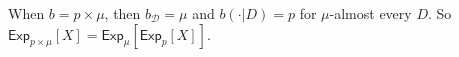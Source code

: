 \documentclass[a4paper,final]{article}
\newcommand\A{\mathcal{A}}
\newcommand\Exp{\mathsf{Exp}}
\newcommand\U{\mathfrak{U}} %
\newcommand{\Decs}{\mathcal{D}}
\newcommand\s{\mathsf{s}}
\newcommand{\n}{\mathsf{n}}
\renewcommand{\nu}{\n}
\renewcommand{\Re}{\mathbb{R}}
\renewcommand{\color}[1]{}
\newenvironment{colored}[1]{\leavevmode\color{#1}}{}
\newcommand*\diff{\mathop{}\!\mathrm{d}}
\newenvironment{CCM rewritten}
{\begingroup\color{blue}} %
{\endgroup}              %
\begin{document}
\begin{colored}{violet}
When $b=p\times\mu$, then $b_\Decs=\mu$ and $b(\cdot|D)=p$ for $\mu$-almost every $D$. So $\Exp_{p\times\mu}[X]=\Exp_{\mu}[\Exp_{p}[X]]$. 

\end{colored}
\end{document}
